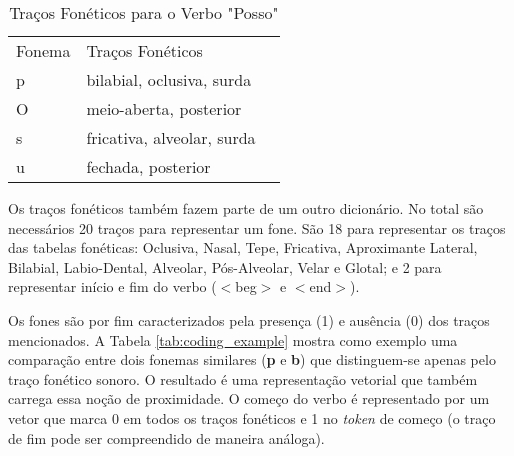\begin{table}[H]
\begin{center}
\begin{tabular}{lll}
Fonema & Traços Fonéticos &  \\ \cline{1-2}
p & bilabial, oclusiva, surda &  \\
O & meio-aberta, posterior &  \\
s & fricativa, alveolar, surda &  \\
u & fechada, posterior & 
\end{tabular}
\end{center}
\caption{Traços Fonéticos para o Verbo "Posso"}
\label{tab:pOsu}
\end{table}

Os traços fonéticos também fazem parte de um outro dicionário. No total são necessários 20 traços para representar um fone. São 18 para representar os traços das tabelas fonéticas: Oclusiva, Nasal, Tepe, Fricativa, Aproximante Lateral, Bilabial, Labio-Dental, Alveolar, Pós-Alveolar, Velar e Glotal; e 2 para representar início e fim do verbo ($<$beg$>$ e $<$end$>$).

Os fones são por fim caracterizados pela presença (1) e ausência (0) dos traços mencionados.  A Tabela \ref{tab:coding_example} mostra como exemplo uma comparação entre dois fonemas similares (\textbf{p} e \textbf{b}) que distinguem-se apenas pelo traço fonético sonoro. O resultado é uma representação vetorial que também carrega essa noção de proximidade. O começo do verbo é representado por um vetor que marca 0 em todos os traços fonéticos e 1 no \textit{token} de começo (o traço de fim pode ser compreendido de maneira análoga). 

